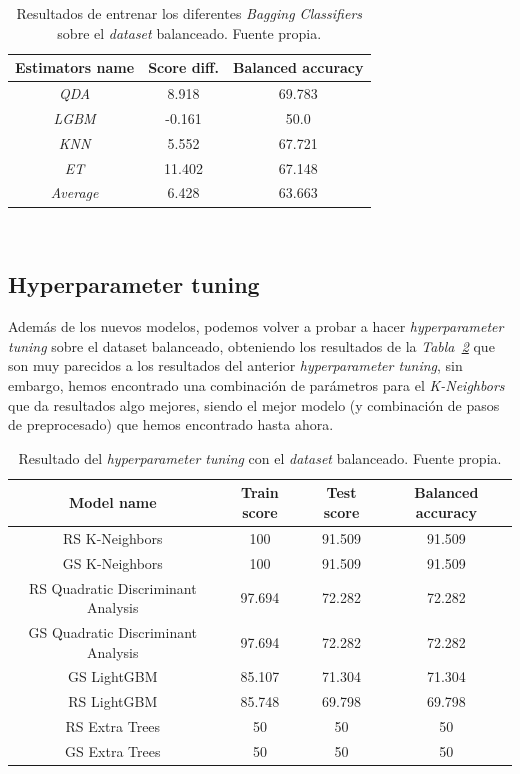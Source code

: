 \begin{table}[!h]
    \centering
    \begin{tabular}{|c|cc|}
        \hline
        Estimators name & Score diff. & Balanced accuracy \\ \hline
        \textit{QDA} & 8.918 & 69.783 \\ 
        \textit{LGBM} & -0.161 & 50.0 \\ 
        \textit{KNN} & 5.552 & 67.721 \\ 
        \textit{ET} & 11.402 & 67.148 \\ \hline
        \textit{Average} & 6.428 & 63.663 \\ \hline
    \end{tabular}
    \caption{Resultados de entrenar los diferentes \textit{Bagging Classifiers} sobre el \textit{dataset} balanceado. Fuente propia.}\ \label{tab:bagging-results}
\end{table}

\clearpage
\subsection{Hyperparameter tuning}

Además de los nuevos modelos, podemos volver a probar a hacer \textit{hyperparameter tuning} sobre el dataset balanceado, obteniendo los resultados de la \textit{Tabla\ \ref{tab:hyperparameter-tuning-results-v2}} que son muy parecidos a los resultados del anterior \textit{hyperparameter tuning}, sin embargo, hemos encontrado una combinación de parámetros para el \textit{K-Neighbors} que da resultados algo mejores, siendo el mejor modelo (y combinación de pasos de preprocesado) que hemos encontrado hasta ahora.

\begin{table}[!h]
    \centering
    \begin{tabular}{|c|ccc|} \hline
        Model name & Train score & Test score & Balanced accuracy \\ \hline
        RS K-Neighbors & 100 & 91.509 & 91.509 \\ 
        GS K-Neighbors & 100 & 91.509 & 91.509 \\ 
        RS Quadratic Discriminant Analysis & 97.694 & 72.282 & 72.282 \\ 
        GS Quadratic Discriminant Analysis & 97.694 & 72.282 & 72.282 \\ 
        GS LightGBM & 85.107 & 71.304 & 71.304 \\ 
        RS LightGBM & 85.748 & 69.798 & 69.798 \\ 
        RS Extra Trees & 50 & 50 & 50 \\ 
        GS Extra Trees & 50 & 50 & 50 \\ \hline
    \end{tabular}
    \caption{Resultado del \textit{hyperparameter tuning} con el \textit{dataset} balanceado. Fuente propia.}\ \label{tab:hyperparameter-tuning-results-v2}
\end{table}